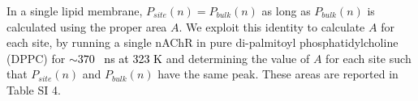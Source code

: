 \documentclass[%
 aip,
 amsmath,amssymb,
 preprint,%
]{revtex4-1}\usepackage{setspace}
\newcommand{\liam}[1]{\textcolor{black}{#1}}
\newcommand{\grace}[1]{\textcolor{black}{{#1}}}
\newcommand{\nachr}{nAChR}
\begin{document}
In a single lipid membrane, $P_{site}(n)=P_{bulk}(n)$ as long as $P_{bulk}(n)$ is calculated using the proper area $A$.  We exploit this identity to calculate $A$ for each site, by running a single \nachr{} in pure di-palmitoyl phosphatidylcholine (DPPC) for \liam{$\sim 370$~ ns at 323 K} and determining the value of $A$ for each site such that $P_{site}(n)$ and $P_{bulk}(n)$ have the same peak.  These areas are reported in Table SI 4. 

    
    
\end{document}
